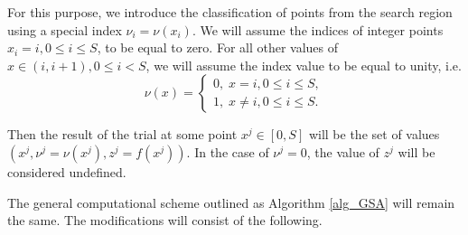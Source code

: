 \documentclass[iicol]{sn-jnl}
\theoremstyle{thmstyleone}%
\theoremstyle{thmstyletwo}%
\theoremstyle{thmstylethree}%
\begin{document}
For this purpose, we introduce the classification of points from the search region using a special index $\nu_i=\nu(x_i)$. We will assume the indices of integer points $x_i = i, 0\leq i \leq S$, to be equal to zero. For all other values of $x\in(i,i+1),  0 \leq i < S$, we will assume the index value to be equal to unity, i.e.  
\begin{equation}\label{index}
	\nu(x) = \left\{
   \begin{array}{lr}
     0, \; x = i, 0\leq i \leq S, \\
     1, \; x \neq i,  0 \leq i \leq S.
   \end{array}
\right.
\end{equation}

Then the result of the trial at some point $x^j\in[0,S]$  will be the set of values $(x^j, \nu^j=\nu(x^j), z^j = f(x^j))$. In the case of  $\nu^j=0$, the value of $z^j$ will be considered undefined.

The general computational scheme outlined as Algorithm \ref{alg_GSA} will remain the same. The modifications will consist of the following.
\end{document}
